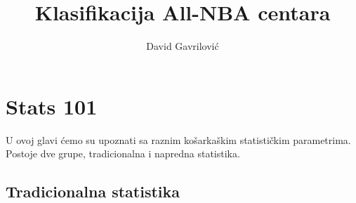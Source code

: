 \documentclass[a4paper]{article}
\begin{document}
\title{Klasifikacija All-NBA centara}
\author{David Gavrilović}
\maketitle
\thispagestyle{empty}

\newpage

\tableofcontents
\thispagestyle{empty}

\newpage

\section{Stats 101}
\label{sec:stats_101}

U ovoj glavi ćemo su upoznati sa raznim košarkaškim statističkim parametrima. Postoje dve grupe, tradicionalna i napredna statistika.

\subsection{Tradicionalna statistika}
\label{subsec:trad_stat}
\end{document}
